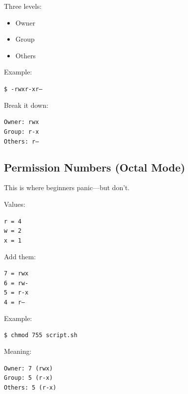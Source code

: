 \documentclass[12pt]{article}
\begin{document}
Three levels:

\begin{itemize}
    \item Owner
    \item Group
    \item Others
\end{itemize}

Example:

\begin{highlightbox}
\texttt{\$ -rwxr-xr--}
\end{highlightbox}

Break it down:

\begin{infobox}
\texttt{Owner:  rwx}\\
\texttt{Group:  r-x}\\
\texttt{Others: r--}
\end{infobox}

\subsection*{Permission Numbers (Octal Mode)}

This is where beginners panic—but don't.

Values:

\begin{infobox}
\texttt{r = 4}\\
\texttt{w = 2}\\
\texttt{x = 1}
\end{infobox}

Add them:

\begin{infobox}
\texttt{7 = rwx}\\
\texttt{6 = rw-}\\
\texttt{5 = r-x}\\
\texttt{4 = r--}
\end{infobox}

Example:

\begin{highlightbox}
\texttt{\$ chmod 755 script.sh}
\end{highlightbox}

Meaning:

\begin{infobox}
\texttt{Owner: 7 (rwx)}\\
\texttt{Group: 5 (r-x)}\\
\texttt{Others: 5 (r-x)}
\end{infobox}
\end{document}
